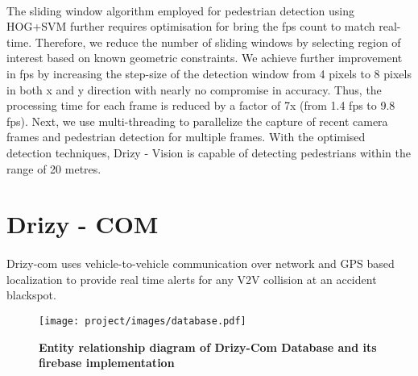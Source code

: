\paragraph{}The sliding window algorithm employed for pedestrian detection using HOG+SVM further requires optimisation for bring the fps count to match real-time. Therefore, we reduce the number of sliding windows by selecting region of interest based on known geometric constraints. We achieve further improvement in fps by increasing the step-size of the detection window from 4 pixels to 8 pixels in both x and y direction with nearly no compromise in accuracy. Thus, the processing time for each frame is reduced by a factor of 7x (from 1.4 fps to 9.8 fps). Next, we use multi-threading to parallelize the capture of recent camera frames and pedestrian detection for multiple frames. With the optimised detection techniques, Drizy - Vision is capable of detecting pedestrians within the range of 20 metres.


\section{Drizy - COM}
\paragraph{}Drizy-com uses vehicle-to-vehicle communication over network and GPS based localization to provide real time alerts for any V2V collision at an accident blackspot.\\
    \begin{figure}[hbtp]
    \centering
    {
    \vspace{-0.5cm}
    \texttt{[image: project/images/database.pdf]}
    \vspace{-1.5cm}
    \caption{\textbf{Entity relationship diagram of Drizy-Com Database and its firebase implementation}}
    \label{fig:database}
    }
    \end{figure}
